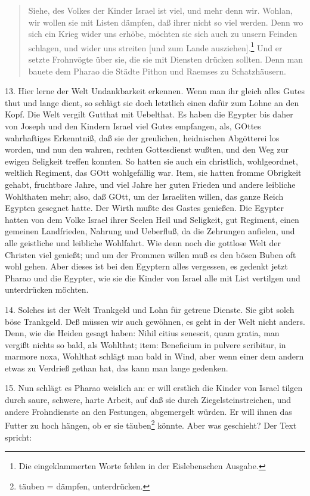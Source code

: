 \begin{quote}
Siehe, des Volkes der Kinder Israel ist viel, und mehr denn wir. Wohlan, wir wollen sie mit Listen dämpfen, daß ihrer nicht so viel werden. Denn wo sich ein Krieg wider uns erhöbe, möchten sie sich auch zu unsern Feinden schlagen, und wider uns streiten [und zum Lande ausziehen].\footnote{Die eingeklammerten Worte fehlen in der Eislebenschen Ausgabe.} Und er setzte Frohnvögte über sie, die sie mit Diensten drücken sollten. Denn man bauete dem Pharao die Städte Pithon und Raemses zu Schatzhäusern.
\end{quote}

13. Hier lerne der Welt Undankbarkeit erkennen. Wenn man ihr gleich alles Gutes thut und lange dient, so schlägt sie doch letztlich einen dafür zum Lohne an den Kopf. Die Welt vergilt
Gutthat mit Uebelthat. Es haben die Egypter bis daher von Joseph und den Kindern Israel viel Gutes empfangen, als, GOttes wahrhaftiges Erkenntniß, daß sie der greulichen, heidnischen Abgötterei los worden, und nun den wahren, rechten Gottesdienst wußten, und den Weg zur ewigen Seligkeit treffen konnten. So hatten sie auch ein christlich, wohlgeordnet, weltlich Regiment, das GOtt wohlgefällig war. Item, sie hatten fromme Obrigkeit gehabt, fruchtbare Jahre, und viel Jahre her guten Frieden und andere leibliche Wohlthaten mehr; also, daß GOtt, um der Israeliten willen, das ganze Reich Egypten gesegnet hatte. Der Wirth mußte des Gastes genießen. Die Egypter hatten von dem Volke Israel ihrer Seelen Heil und Seligkeit, gut Regiment, einen gemeinen Landfrieden, Nahrung und Ueberfluß, da die Zehrungen anfielen, und alle geistliche und leibliche Wohlfahrt. Wie denn noch die gottlose Welt der Christen viel genießt; und um der Frommen willen muß es den bösen Buben oft wohl gehen. Aber dieses ist bei den Egyptern alles vergessen, es gedenkt jetzt Pharao und die Egypter, wie sie die Kinder von Israel alle mit List vertilgen und unterdrücken möchten.

14. Solches ist der Welt Trankgeld und Lohn für getreue Dienste. Sie gibt solch böse Trankgeld. Deß müssen wir auch gewöhnen, es geht in der Welt nicht anders. Denn, wie die Heiden gesagt haben: Nihil citius senescit, quam gratia, man vergißt nichts so bald, als Wohlthat; item: Beneficium in pulvere scribitur, in marmore noxa, Wohlthat schlägt man bald in Wind, aber wenn einer dem andern etwas zu Verdrieß gethan hat, das kann man lange gedenken.

15. Nun schlägt es Pharao weislich an: er will erstlich die Kinder von Israel tilgen durch saure, schwere, harte Arbeit, auf daß sie durch Ziegelsteinstreichen, und andere Frohndienste an den Festungen, abgemergelt würden. Er will ihnen das Futter zu hoch hängen, ob er sie täuben\footnote{täuben = dämpfen, unterdrücken.} könnte. Aber was geschieht? Der Text spricht:

